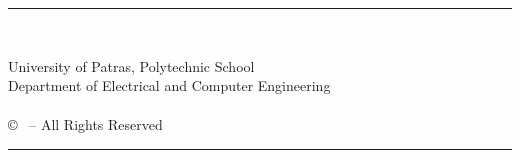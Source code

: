 \pagestyle{empty}

\vspace*{\fill}
\noindent \hspace{2cm} \rule{12.7cm}{0.4pt}\\
\vspace{-1.7em}
\begin{flushleft}
	\hspace*{30mm}University of Patras, Polytechnic School\\
	\hspace*{30mm}Department of Electrical and Computer Engineering\\
	\hspace*{30mm}{\nomme}\\
	\hspace*{30mm}© \monthyear \ -- All Rights Reserved\\
\end{flushleft}
\vspace{-1.2em}
\noindent \hspace{2cm} \rule{12.7cm}{0.4pt}
